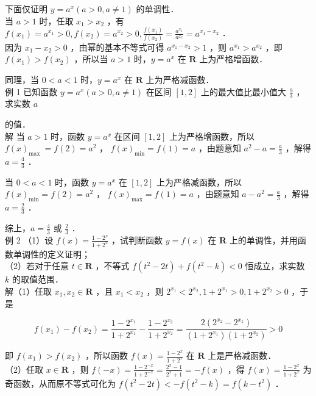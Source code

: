 \documentclass[10pt]{article}
\begin{document}
下面仅证明 \(y=a^{x}(a>0, a \neq 1)\) 的单调性．\\
当 \(a>1\) 时，任取 \(x_{1}>x_{2}\) ，有 \(f\left(x_{1}\right)=a^{x_{1}}>0, f\left(x_{2}\right)=a^{x_{2}}>0, \frac{f\left(x_{1}\right)}{f\left(x_{2}\right)}=\frac{a^{x_{1}}}{a^{x_{2}}}=a^{x_{1}-x_{2}}\) ．\\
因为 \(x_{1}-x_{2}>0\) ，由幂的基本不等式可得 \(a^{x_{1}-x_{2}}>1\) ，则 \(a^{x_{1}}>a^{x_{2}}\) ，即 \(f\left(x_{1}\right)>f\left(x_{2}\right)\) ，所以当 \(a>1\) 时，\(y=a^{x}\) 在 \(\mathbf{R}\) 上为严格增函数．

同理，当 \(0<a<1\) 时，\(y=a^{x}\) 在 \(\mathbf{R}\) 上为严格减函数．\\
例 1 已知函数 \(y=a^{x}(a>0, a \neq 1)\) 在区间 \([1,2]\) 上的最大值比最小值大 \(\frac{a}{3}\) ，求实数 \(a\)

的值．\\
解 当 \(a>1\) 时，函数 \(y=a^{x}\) 在区间 \([1,2]\) 上为严格增函数，所以 \(f(x)_{\text {max }}=f(2)=a^{2}\) ， \(f(x)_{\min }=f(1)=a\) ，由题意知 \(a^{2}-a=\frac{a}{3}\) ，解得 \(a=\frac{4}{3}\) ．

当 \(0<a<1\) 时，函数 \(y=a^{x}\) 在 \([1,2]\) 上为严格减函数，所以 \(f(x)_{\min }=f(2)=a^{2}\) ， \(f(x)_{\max }=f(1)=a\) ，由题意知 \(a-a^{2}=\frac{a}{3}\) ，解得 \(a=\frac{2}{3}\) ．

综上，\(a=\frac{4}{3}\) 或 \(\frac{2}{3}\) ．\\
例 2 （1）设 \(f(x)=\frac{1-2^{x}}{1+2^{x}}\) ，试判断函数 \(y=f(x)\) 在 \(\mathbf{R}\) 上的单调性，并用函数单调性的定义证明；\\
（2）若对于任意 \(t \in \mathbf{R}\) ，不等式 \(f\left(t^{2}-2 t\right)+f\left(t^{2}-k\right)<0\) 恒成立，求实数 \(k\) 的取值范围．\\
解（1）任取 \(x_{1}, x_{2} \in \mathbf{R}\) ，且 \(x_{1}<x_{2}\) ，则 \(2^{x_{1}}<2^{x_{2}}, 1+2^{x_{1}}>0,1+2^{x_{2}}>0\) ，于是

\[
f\left(x_{1}\right)-f\left(x_{2}\right)=\frac{1-2^{x_{1}}}{1+2^{x_{1}}}-\frac{1-2^{x_{2}}}{1+2^{x_{2}}}=\frac{2\left(2^{x_{2}}-2^{x_{1}}\right)}{\left(1+2^{x_{1}}\right)\left(1+2^{x_{2}}\right)}>0
\]

即 \(f\left(x_{1}\right)>f\left(x_{2}\right)\) ，所以函数 \(f(x)=\frac{1-2^{x}}{1+2^{x}}\) 在 \(\mathbf{R}\) 上是严格减函数．\\
（2）任取 \(x \in \mathbf{R}\) ，则 \(f(-x)=\frac{1-2^{-x}}{1+2^{-x}}=\frac{2^{x}-1}{2^{x}+1}=-f(x)\) ，得 \(f(x)=\frac{1-2^{x}}{1+2^{x}}\) 为奇函数，从而原不等式可化为 \(f\left(t^{2}-2 t\right)<-f\left(t^{2}-k\right)=f\left(k-t^{2}\right)\) ．
\end{document}
